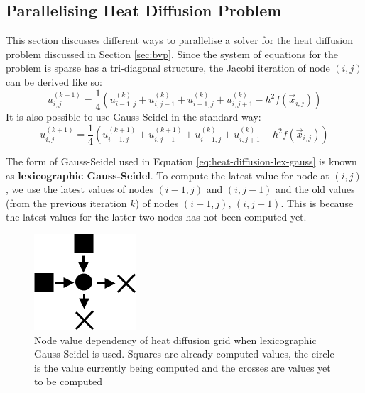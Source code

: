 \documentclass{article}
\begin{document}
\subsection{Parallelising Heat Diffusion Problem}
\label{sec:heat-diffusion-parallel}

This section discusses different ways to parallelise a solver for the heat diffusion problem discussed in Section \ref{sec:bvp}. Since the system of equations for the problem is sparse has a tri-diagonal structure, the Jacobi iteration of node $(i, j)$ can be derived like so:
\begin{equation}
	u_{i,j}^{(k + 1)} = \frac{1}{4}\left( u_{i-1,j}^{(k)} + u_{i,j-1}^{(k)} + u_{i+1,j}^{(k)} + u_{i,j+1}^{(k)} - h^2f(\vec{x}_{i,j}) \right)
	\label{eq:heat-diffusion-jacobi}
\end{equation}
It is also possible to use Gauss-Seidel in the standard way:
\begin{equation}
	u_{i,j}^{(k + 1)} = \frac{1}{4}\left( u_{i-1,j}^{(k+1)} + u_{i,j-1}^{(k+1)} + u_{i+1,j}^{(k)} + u_{i,j+1}^{(k)} - h^2f(\vec{x}_{i,j}) \right)
	\label{eq:heat-diffusion-lex-gauss}
\end{equation}

The form of Gauss-Seidel used in Equation \ref{eq:heat-diffusion-lex-gauss} is known as \textbf{lexicographic Gauss-Seidel}. To compute the latest value for node at $(i, j)$, we use the latest values of nodes $(i - 1, j)$ and $(i, j - 1)$ and the old values (from the previous iteration $k$) of nodes $(i + 1, j)$, $(i, j + 1)$. This is because the latest values for the latter two nodes has not been computed yet.

\begin{figure}
	\centering
	\includegraphics[scale=0.5]{figures/lexicographic-gauss.png}
	\caption{Node value dependency of heat diffusion grid when lexicographic Gauss-Seidel is used. Squares are already computed values, the circle is the value currently being computed and the crosses are values yet to be computed}
	\label{fig:lexicographic-gauss}
\end{figure}
\end{document}

